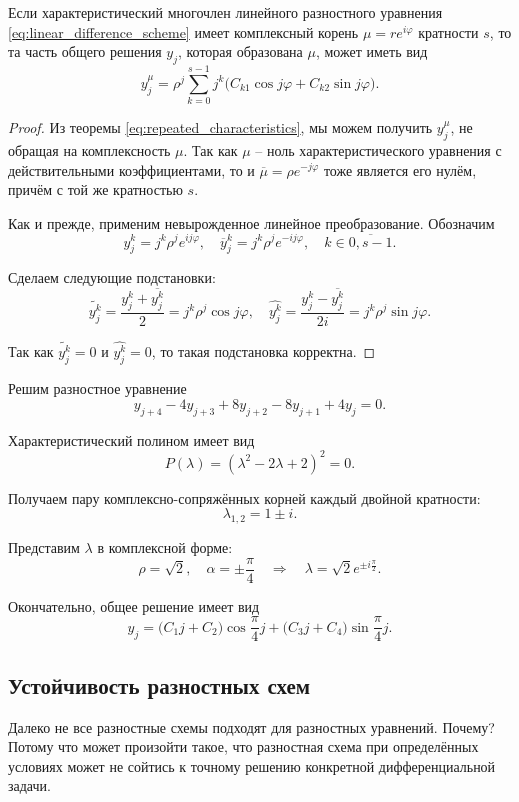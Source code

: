 \documentclass[../main.tex]{subfile}
\begin{document}
\begin{theorem}\label{eq:complex_roots_de}
	Если характеристический многочлен линейного разностного уравнения
	\eqref{eq:linear_difference_scheme} имеет комплексный корень
	$\mu=re^{i\varphi}$ кратности $s$, то та часть общего решения $y_j$,
	которая образована $\mu$, может иметь вид
	\[\boxed{y_j^\mu=\rho^j\sum_{k=0}^{s-1}j^k\big(C_{k1}\cos{j\varphi}+
	C_{k2}\sin{j\varphi}\big)}.\]
\end{theorem}

\begin{proof}
	Из теоремы \eqref{eq:repeated_characteristics}, мы можем получить
	$y_j^\mu$, не обращая на комплексность $\mu$. Так как $\mu$ -- ноль
	характеристического уравнения с действительными коэффициентами, то и
	$\overline{\mu}=\rho e^ {-j\varphi}$ тоже является его нулём, причём с
	той же кратностью $s$.

	Как и прежде, применим невырожденное линейное преобразование. Обозначим
	\[y_j^k=j^k\rho^je^{ij\varphi},\quad \overline{y}_j^k=j^k\rho^je^
	{-ij\varphi},\quad k\in\overline{0,s-1}.\]

	Сделаем следующие подстановки:
	\[\widetilde{y_j^k}=\frac{y_j^k+\overline{y_j^k}}{2}=j^k\rho^j\cos
	{j\varphi},\quad\widehat{y_j^k}=\frac{y_j^k-\overline{y_j^k}}{2i}=j^k
	\rho^j\sin{j\varphi}.\]

	Так как $\widetilde{y_j^k}=0$ и $\widehat{y_j^k}=0$, то такая
	подстановка корректна.
\end{proof}

\begin{example}\label{eq:complexes_difference_eq}
	Решим разностное уравнение
	\[y_{j+4}-4y_{j+3}+8y_{j+2}-8y_{j+1}+4y_j=0.\]

	Характеристический полином имеет вид
	\[P(\lambda)=(\lambda^2-2\lambda+2)^2=0.\]

	Получаем пару комплексно-сопряжённых корней каждый двойной кратности:
	\[\lambda_{1,2}=1\pm i.\]

	Представим $\lambda$ в комплексной форме:
	\[\rho=\sqrt{2},\quad\alpha=\pm\frac{\pi}{4}\quad\Rightarrow\quad
	\lambda=\sqrt{2}e^{\pm i\frac{\pi}{2}}.\]

	Окончательно, общее решение имеет вид
	\[y_j=\big(C_1j+C_2\big)\cos{\frac{\pi}{4}j}+\big(C_3j+C_4\big)
	\sin{\frac{\pi}{4}j}.\]
\end{example}

\subsection{Устойчивость разностных схем}
Далеко не все разностные схемы подходят для разностных уравнений. Почему?
Потому что может произойти такое, что разностная схема при определённых
условиях может не сойтись к точному решению конкретной дифференциальной
задачи.
\end{document}
